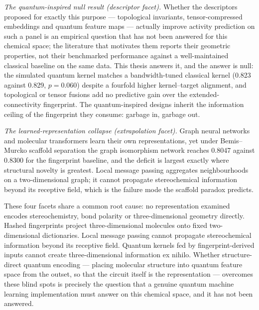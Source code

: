 \emph{The quantum-inspired null result (descriptor facet).} Whether the descriptors proposed for exactly this purpose --- topological invariants, tensor-compressed embeddings and quantum feature maps --- actually improve activity prediction on such a panel is an empirical question that has not been answered for this chemical space; the literature that motivates them reports their geometric properties, not their benchmarked performance against a well-maintained classical baseline on the same data. This thesis answers it, and the answer is null: the simulated quantum kernel matches a bandwidth-tuned classical kernel (\num{0.823} against \num{0.829}, $p = \num{0.060}$) despite a fourfold higher kernel--target alignment, and topological or tensor fusions add no predictive gain over the extended-connectivity fingerprint. The quantum-inspired designs inherit the information ceiling of the fingerprint they consume: garbage in, garbage out.

\emph{The learned-representation collapse (extrapolation facet).} Graph neural networks and molecular transformers learn their own representations, yet under Bemis--Murcko scaffold separation the graph isomorphism network reaches \num{0.8047} against \num{0.8300} for the fingerprint baseline, and the deficit is largest exactly where structural novelty is greatest. Local message passing aggregates neighbourhoods on a two-dimensional graph; it cannot propagate stereochemical information beyond its receptive field, which is the failure mode the scaffold paradox predicts.

These four facets share a common root cause: no representation examined encodes stereochemistry, bond polarity or three-dimensional geometry directly. Hashed fingerprints project three-dimensional molecules onto fixed two-dimensional dictionaries. Local message passing cannot propagate stereochemical information beyond its receptive field. Quantum kernels fed by fingerprint-derived inputs cannot create three-dimensional information ex nihilo. Whether structure-direct quantum encoding --- placing molecular structure into quantum feature space from the outset, so that the circuit itself is the representation --- overcomes these blind spots is precisely the question that a genuine quantum machine learning implementation must answer on this chemical space, and it has not been answered.

